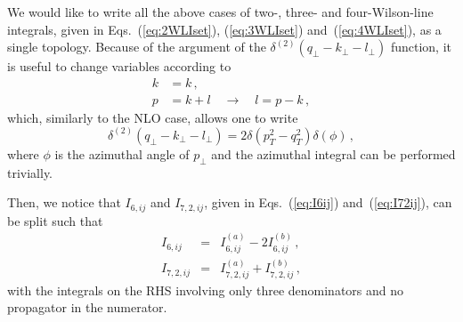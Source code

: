 \documentclass[a4paper,11pt]{article}
\numberwithin{equation}{section}
\begin{document}
We would like to write all the above cases of two-, three- and four-Wilson-line
integrals, given in Eqs.~(\ref{eq:2WLIset}), (\ref{eq:3WLIset})
and~(\ref{eq:4WLIset}), as a single topology. 
%
Because of the argument of the $\delta^{(2)}(q_\perp-k_\perp-l_\perp)$ function,
it is useful to change variables according to
%
\begin{subequations}
\begin{align}
  k &= k\,,  \\
  p &= k+l \quad \to \quad l = p-k\,, 
\end{align}
\end{subequations}
%
which, similarly to the NLO case, allows one to write
%
\begin{equation}
  \delta^{(2)}(q_\perp-k_\perp-l_\perp) = 2 \delta(p_T^2-q_T^2) \delta(\phi)\,,
\end{equation}
%
where $\phi$ is the azimuthal angle of $p_\perp$ and the azimuthal integral
can be performed trivially.

Then, we notice that $I_{6,ij}$ and $I_{7,2,ij}$, given in Eqs.~(\ref{eq:I6ij})
and~(\ref{eq:I72ij}), can be split such that
%
\begin{eqnarray}
  I_{6,ij} & = & I^{(a)}_{6,ij} - 2 I^{(b)}_{6,ij}\,, \\
  I_{7,2,ij} & = &  I^{(a)}_{7,2,ij} + I^{(b)}_{7,2,ij}\,,
\end{eqnarray}
%
with the integrals on the RHS involving only three denominators and no
propagator in the numerator.
\end{document}
